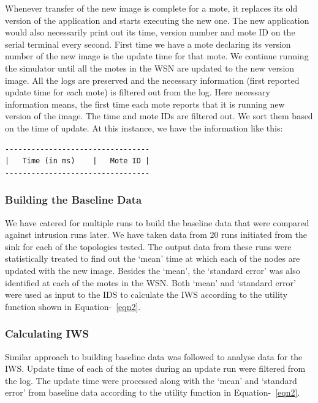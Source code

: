 \documentclass[conference,final]{IEEEtran}
\begin{document}
Whenever transfer of the new image is complete for a mote, it replaces its old version of the application and starts executing the new one. The new application would also necessarily print out its time, version number and mote ID on the serial terminal every second. 
First time we have a mote declaring its version number of the new image is the update time for that mote. We continue running the simulator until all the motes in the WSN are updated to the new version image. All the logs are preserved and the necessary information (first reported update time for each mote) is filtered out from the log. Here necessary information means, the first time each mote reports that it is running new version of the image. The time and mote IDs are filtered out. We sort them based on the time of update. At this instance, we have the information like this:
\begin{verbatim}
---------------------------------
| 	Time (in ms)	|	Mote ID	|
---------------------------------
\end{verbatim}

\subsubsection*{Building the Baseline Data}
We have catered for multiple runs to build the baseline data that were compared against intrusion runs later.
We have taken data from 20 runs initiated from the sink for each of the topologies tested.
The output data from these runs were statistically treated to find out the `mean' time at which each of the nodes are updated with the new image.
Besides the `mean', the `standard error' was also identified at each of the motes in the WSN.
Both `mean' and `standard error' were used as input to the IDS to calculate the IWS according to the utility function shown in Equation-~\ref{eqn2}. 

\subsubsection*{Calculating IWS}
Similar approach to building baseline data was followed to analyse data for the IWS.
Update time of each of the motes during an update run were filtered from the log.
The update time were processed along with the `mean' and `standard error' from baseline data according to the utility function in Equation-~\ref{eqn2}. 
\end{document}
